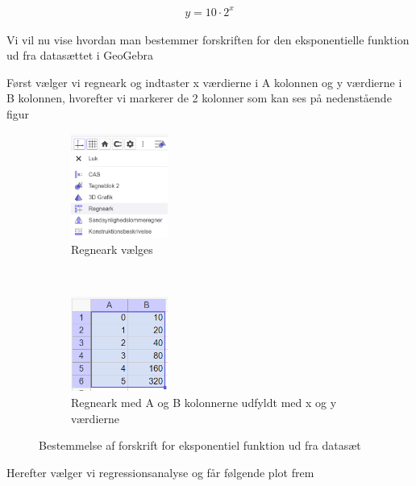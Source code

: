 \begin{align*}
y = 10\cdot 2^x
\end{align*}

\newpage 

Vi vil nu vise hvordan man bestemmer forskriften for den eksponentielle funktion ud fra datasættet i GeoGebra

Først vælger vi regneark og indtaster x værdierne i A kolonnen og y værdierne i B kolonnen, hvorefter vi markerer de 2 kolonner som kan ses på nedenstående figur

\begin{figure}[ht]
    \centering
    \begin{subfigure}[t]{0.5\textwidth}
        \centering
        \includegraphics[width=0.35\textwidth]{img_1}
        \caption{Regneark vælges}
    \end{subfigure}%
    ~ 
    \begin{subfigure}[t]{0.5\textwidth}
        \centering
        \includegraphics[width=0.35\textwidth]{img_2}
        \caption{Regneark med A og B kolonnerne udfyldt med x og y værdierne}
    \end{subfigure}
    \caption{Bestemmelse af forskrift for eksponentiel funktion ud fra datasæt}
\end{figure}

Herefter vælger vi regressionsanalyse og får følgende plot frem

